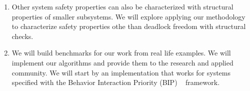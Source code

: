 \begin{enumerate}
\item
Other system safety properties can also be characterized with structural 
properties of smaller subsystems. 
We will explore applying our methodology to characterize safety properties 
othe than deadlock freedom with structural checks. 

\item 
We will build benchmarks for our work from real life examples.
We will implement our algorithms and provide them to the research and 
applied community. 
We will start by an implementation that works for systems specified with 
the Behavior Interaction Priority (BIP) ~\cite{bip} framework.

\end{enumerate}


